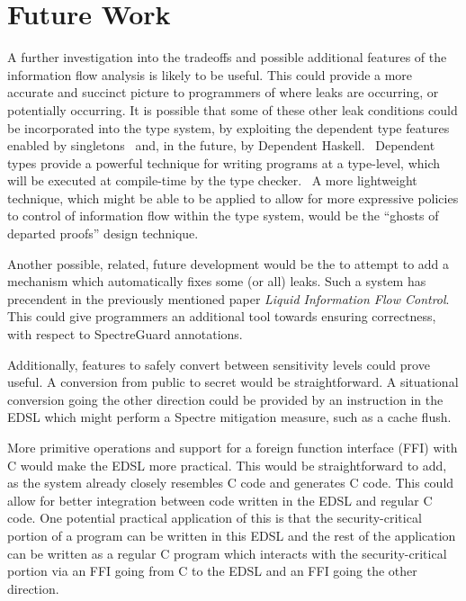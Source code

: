 \documentclass[10pt, conference]{IEEEtran}
\begin{document}
\section{Future Work}
\label{sec:FutureWork}
A further investigation into the tradeoffs and possible additional features of
the information flow analysis is likely to be useful. This could provide a more
accurate and succinct picture to programmers of where leaks are occurring, or
potentially occurring. It is possible that some of these other leak conditions
could be incorporated into the type system, by exploiting the dependent type
features enabled by singletons~\cite{Singletons} and, in the future, by
Dependent Haskell.~\cite{DepHaskSpec} Dependent types provide a powerful
technique for writing programs at a type-level, which will be executed at
compile-time by the type checker.~\cite{CertProg, DepHaskSpec} A more
lightweight technique, which might be able to be applied to allow for more
expressive policies to control of information flow within the type system, would
be the ``ghosts of departed proofs'' design technique.~\cite{DepartedProofs}

Another possible, related, future development would be the to attempt to add a
mechanism which automatically fixes some (or all) leaks. Such a system has precendent
in the previously mentioned paper \textit{Liquid Information Flow Control}.~\cite{Lifty}
This could give programmers an additional tool towards ensuring correctness, with
respect to SpectreGuard annotations.

Additionally, features to safely convert between sensitivity levels could prove
useful. A conversion from public to secret would be straightforward. A situational conversion
going the other direction could be provided by an instruction in the EDSL
which might perform a Spectre mitigation measure, such as a cache flush.~\cite{PLtea-james}

More primitive operations and support for a foreign function interface (FFI)
with C would make the EDSL more practical. This would be straightforward to add,
as the system already closely resembles C code and generates C code. This could allow
for better integration between code written in the EDSL and regular C code. One potential
practical application of this is that the security-critical portion of a program
can be written in this EDSL and the rest of the application can be written as a regular
C program which interacts with the security-critical portion via an FFI going from C to
the EDSL and an FFI going the other direction.
\end{document}
